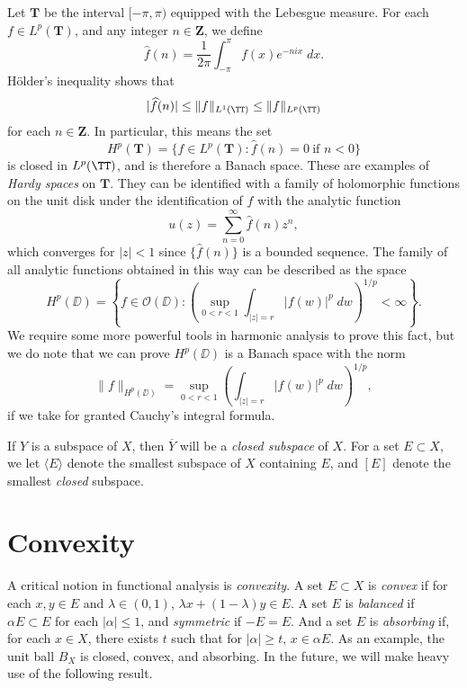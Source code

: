 \begin{example}
    Let $\mathbf{T}$ be the interval $[-\pi,\pi)$ equipped with the Lebesgue measure. For each $f \in L^p(\mathbf{T})$, and any integer $n \in \mathbf{Z}$, we define
    \[ \widehat{f}(n) = \frac{1}{2\pi} \int_{-\pi}^\pi f(x) e^{-nix}\; dx. \]
    H\"{o}lder's inequality shows that
    \[ |\widehat{f}(n)| \leq \| f \|_{L^1(\TT)} \leq \| f \|_{L^p(\TT)} \]
    for each $n \in \mathbf{Z}$. In particular, this means the set
    \[ H^p(\mathbf{T}) = \{ f \in L^p(\mathbf{T}) : \widehat{f}(n) = 0\ \text{if $n < 0$} \} \]
    is closed in $L^p(\TT)$, and is therefore a Banach space. These are examples of {\it Hardy spaces} on $\mathbf{T}$. They can be identified with a family of holomorphic functions on the unit disk under the identification of $f$ with the analytic function
    \[ u(z) = \sum_{n = 0}^\infty \widehat{f}(n) z^n, \]
    which converges for $|z| < 1$ since $\{ \widehat{f}(n) \}$ is a bounded sequence. The family of all analytic functions obtained in this way can be described as the space
    \[ H^p(\DD) = \left\{ f \in \mathcal{O}(\DD) : \left( \sup_{0 < r < 1} \int_{|z| = r} |f(w)|^p\; dw \right)^{1/p} < \infty \right\}. \]
    We require some more powerful tools in harmonic analysis to prove this fact, but we do note that we can prove $H^p(\DD)$ is a Banach space with the norm
    \[ \| f \|_{H^p(\DD)} = \sup_{0 < r < 1} \left( \int_{|z| = r} |f(w)|^p\; dw \right)^{1/p}, \]
    if we take for granted Cauchy's integral formula.
\end{example}

If $Y$ is a subspace of $X$, then $\overline{Y}$ will be a \emph{closed subspace} of $X$. For a set $E \subset X$, we let $\langle E \rangle$ denote the smallest subspace of $X$ containing $E$, and $[E]$ denote the smallest {\it closed} subspace.

\section{Convexity}

A critical notion in functional analysis is {\it convexity}. A set $E \subset X$ is {\it convex} if for each $x,y \in E$ and $\lambda \in (0,1)$, $\lambda x + (1 - \lambda) y \in E$. A set $E$ is {\it balanced} if $\alpha E \subset E$ for each $|\alpha| \leq 1$, and {\it symmetric} if $-E = E$. And a set $E$ is {\it absorbing} if, for each $x \in X$, there exists $t$ such that for $|\alpha| \geq t$, $x \in \alpha E$. As an example, the unit ball $B_X$ is closed, convex, and absorbing. In the future, we will make heavy use of the following result.

